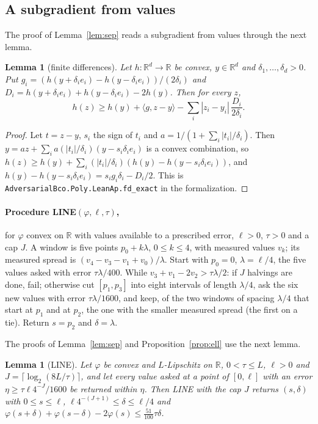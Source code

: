 \documentclass[11pt]{amsart}
\newtheorem{lemma}[theorem]{Lemma}
\theoremstyle{definition}
\numberwithin{equation}{section}
\newcommand{\R}{\mathbb{R}}
\newcommand{\ip}[1]{\langle #1\rangle}
\begin{document}
\subsection{A subgradient from values}

The proof of Lemma~\ref{lem:sep} reads a subgradient from values through the next lemma.

\begin{lemma}[finite differences]\label{lem:fd}
Let $h:\R^d\to\R$ be convex, $y\in\R^d$ and $\delta_1,\dots,\delta_d>0$. Put $g_i=(h(y+\delta_ie_i)-h(y-\delta_ie_i))/(2\delta_i)$ and $D_i=h(y+\delta_ie_i)+h(y-\delta_ie_i)-2h(y)$. Then for every $z$,
\[
h(z)\ge h(y)+\ip{g,z-y}-\sum_i|z_i-y_i|\,\frac{D_i}{2\delta_i}.
\]
\end{lemma}

\begin{proof}
Let $t=z-y$, $s_i$ the sign of $t_i$ and $a=1/(1+\sum_i|t_i|/\delta_i)$. Then $y=az+\sum_ia(|t_i|/\delta_i)(y-s_i\delta_ie_i)$ is a convex combination, so $h(z)\ge h(y)+\sum_i(|t_i|/\delta_i)(h(y)-h(y-s_i\delta_ie_i))$, and $h(y)-h(y-s_i\delta_ie_i)=s_ig_i\delta_i-D_i/2$.
This is \texttt{AdversarialBco.Poly.LeanAp.fd\_exact} in the formalization.
\end{proof}

\paragraph{Procedure LINE$(\varphi,\ell,\tau)$,} for $\varphi$ convex on $\R$ with values available to a prescribed error, $\ell>0$, $\tau>0$ and a cap $J$. A window is five points $p_0+k\lambda$, $0\le k\le4$, with measured values $v_k$; its measured spread is $(v_4-v_3-v_1+v_0)/\lambda$. Start with $p_0=0$, $\lambda=\ell/4$, the five values asked with error $\tau\lambda/400$. While $v_3+v_1-2v_2>\tau\lambda/2$: if $J$ halvings are done, fail; otherwise cut $[p_1,p_3]$ into eight intervals of length $\lambda/4$, ask the six new values with error $\tau\lambda/1600$, and keep, of the two windows of spacing $\lambda/4$ that start at $p_1$ and at $p_2$, the one with the smaller measured spread (the first on a tie). Return $s=p_2$ and $\delta=\lambda$.

The proofs of Lemma~\ref{lem:sep} and Proposition~\ref{prop:ell} use the next lemma.

\begin{lemma}[LINE]\label{lem:line}
Let $\varphi$ be convex and $L$-Lipschitz on $\R$, $0<\tau\le L$, $\ell>0$ and $J=\lceil\log_2(8L/\tau)\rceil$, and let every value asked at a point of $[0,\ell]$ with an error $\eta\ge\tau\ell4^{-J}/1600$ be returned within $\eta$. Then LINE with the cap $J$ returns $(s,\delta)$ with $0\le s\le\ell$, $\ell4^{-(J+1)}\le\delta\le\ell/4$ and $\varphi(s+\delta)+\varphi(s-\delta)-2\varphi(s)\le\frac{51}{100}\tau\delta$.
\end{lemma}
\end{document}
